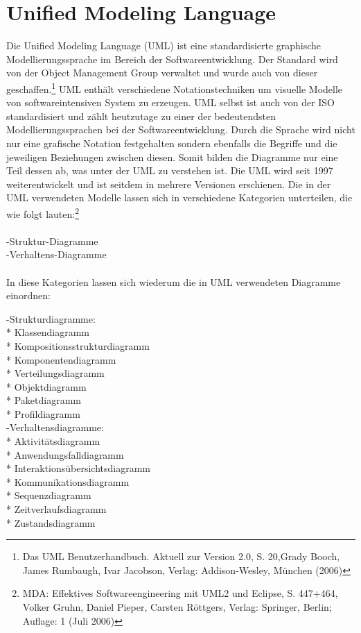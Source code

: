 \section{Unified Modeling Language}
\label{sec:uml}

Die Unified Modeling Language (UML) ist eine standardisierte graphische Modellierungssprache im Bereich der Softwareentwicklung.
Der Standard wird von der Object Management Group verwaltet und wurde auch von dieser geschaffen.\footnote{Das UML Benutzerhandbuch. Aktuell zur Version 2.0, S. 20,Grady Booch, James Rumbaugh, Ivar Jacobson, Verlag: Addison-Wesley, München (2006)}
UML enthält verschiedene Notationstechniken um visuelle Modelle von softwareintensiven System zu erzeugen.
UML selbst ist auch von der ISO standardisiert und zählt heutzutage zu einer der bedeutendsten Modellierungssprachen bei der Softwareentwicklung. Durch die Sprache wird nicht nur eine grafische Notation festgehalten sondern ebenfalls die Begriffe und die jeweiligen Beziehungen zwischen diesen.
Somit bilden die Diagramme nur eine Teil dessen ab, was unter der UML zu verstehen ist.
Die UML wird seit 1997 weiterentwickelt und ist seitdem in mehrere Versionen erschienen.
Die in der UML verwendeten Modelle lassen sich in verschiedene Kategorien unterteilen, die wie folgt lauten:\footnote{MDA: Effektives Softwareengineering mit UML2 und Eclipse, S. 447+464, Volker Gruhn, Daniel Pieper, Carsten Röttgers, Verlag: Springer, Berlin; Auflage: 1 (Juli 2006)}\\
\\
-Struktur-Diagramme\\
-Verhaltens-Diagramme\\
\\
In diese Kategorien lassen sich wiederum die in UML verwendeten Diagramme einordnen:\\
\begin{tabbing}
-Strukturdiagramme:\\
\hspace{10mm} \=* Klassendiagramm\\
\> * Kompositionsstrukturdiagramm\\
\> * Komponentendiagramm\\
\> * Verteilungsdiagramm\\
\> * Objektdiagramm\\
\> * Paketdiagramm\\
\> * Profildiagramm\\
-Verhaltensdiagramme:\\
\> * Aktivitätsdiagramm\\
\> * Anwendungsfalldiagramm\\
\> * Interaktionsübersichtsdiagramm\\
\> * Kommunikationsdiagramm\\
\> * Sequenzdiagramm\\
\> * Zeitverlaufsdiagramm\\
\> * Zustandsdiagramm
\end{tabbing}    


